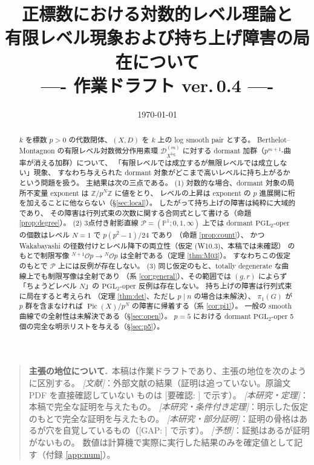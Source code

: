 \documentclass[a4paper,11pt]{ltjsarticle}
\title{正標数における対数的レベル理論と\\有限レベル現象および持ち上げ障害の局在について\\
\large ---- 作業ドラフト ver.\,0.4 ----}
\author{}
\date{\today}
\theoremstyle{plain}
\theoremstyle{definition}
\newcommand{\GAP}[1]{\textcolor{orange!85!black}{\textsf{[GAP: #1]}}}
\newcommand{\NeedsCheck}[1]{\textcolor{blue!70!black}{\textsf{[要確認: #1]}}}
\newcommand{\bbP}{\mathbb{P}}
\newcommand{\bbZ}{\mathbb{Z}}
\newcommand{\cD}{\mathcal{D}}
\newcommand{\sP}{\mathscr{P}}
\newcommand{\Pic}{\operatorname{Pic}}
\newcommand{\Op}{\mathcal{O}p}
\begin{document}
\maketitle

\begin{quote}\small\sffamily
\textbf{主張の地位について.}\ 本稿は作業ドラフトであり、主張の地位を次のように区別する。
\emph{[文献]}：外部文献の結果（証明は追っていない。原論文 PDF を直接確認していない
ものは \NeedsCheck{} で示す）。
\emph{[本研究・定理]}：本稿で完全な証明を与えたもの。
\emph{[本研究・条件付き定理]}：明示した仮定のもとで完全な証明を与えたもの。
\emph{[本研究・部分証明]}：証明の骨格はあるが穴を自覚しているもの（\GAP{} で示す）。
\emph{[予想]}：証拠はあるが証明がないもの。
数値は計算機で実際に実行した結果のみを確定値として記す（付録 \ref{app:num}）。
\end{quote}

\begin{abstract}
$k$ を標数 $p>0$ の代数閉体、$(X,D)$ を $k$ 上の log smooth pair とする。
Berthelot--Montagnon の有限レベル対数微分作用素環 $\cD^{(m)}_{X^{\log}}$ に対する
dormant 加群（$p^{m+1}$-曲率が消える加群）について、
「有限レベルでは成立するが無限レベルでは成立しない」現象、
すなわち与えられた dormant 対象がどこまで高いレベルに持ち上がるかという問題を扱う。
主結果は次の三点である。
(1) 対数的な場合、dormant 対象の局所不変量 exponent は $\bbZ/p^{N}\bbZ$ に値をとり、
レベルの上昇は exponent の $p$ 進展開に桁を加えることに他ならない（\S\ref{sec:local}）。
したがって持ち上げの障害は純粋に大域的であり、
その障害は行列式束の次数に関する合同式として書ける（命題 \ref{prop:degree}）。
(2) 3点付き射影直線 $\sP=(\bbP^1;0,1,\infty)$ 上では
dormant $\mathrm{PGL}_2$-oper の個数はレベル $N=1$ で $p(p^2-1)/24$ であり
（命題 \ref{prop:count}）、
かつ Wakabayashi の径数付けとレベル降下の両立性（仮定 (W10.3)、本稿では未確認）
のもとで制限写像 ${}^{N+1}\Op\to{}^{N}\Op$ は全射である（定理 \ref{thm:M03}）。
すなわちこの仮定のもとで $\sP$ 上には反例が存在しない。
(3) 同じ仮定のもと、totally degenerate な曲線上でも制限写像は全射であり
（系 \ref{cor:general}）、その範囲では $(g,r)$ によらず
「ちょうどレベル $N$」の $\mathrm{PGL}_2$-oper 反例は存在しない。
持ち上げの障害は行列式束に局在すると考えられ
（定理 \ref{thm:det}、ただし $p\mid n$ の場合は未解決）、
$\pi_1(G)$ が $p$ 群を含まなければ $\Pic(X)/p^N$ の障害に帰着する（系 \ref{cor:pi1}）。
一般の smooth 曲線での全射性は未解決である（\S\ref{sec:open}）。
$p=5$ における dormant $\mathrm{PGL}_2$-oper 5 個の完全な明示リストを与える（\S\ref{sec:p5}）。
\end{abstract}
\end{document}

